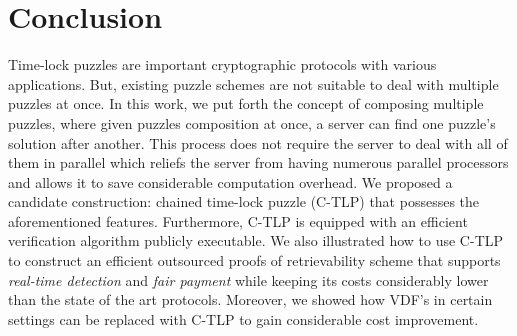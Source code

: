 \vspace{-4mm}

\section{Conclusion}
\vspace{-3mm}

Time-lock puzzles are important cryptographic protocols with various applications. But,  existing puzzle schemes are not suitable to deal with multiple puzzles at once.  In this work, we put forth the concept of composing multiple puzzles, where given puzzles composition at once, a server can find one puzzle's solution after another. This process does not require the server to deal with all of them in parallel which reliefs the server from having numerous parallel processors and allows it to save considerable computation overhead. We proposed a candidate construction: chained  time-lock puzzle (C-TLP) that possesses the aforementioned features. Furthermore, C-TLP is equipped with an efficient verification algorithm publicly executable.  We also illustrated how to use C-TLP to construct an  efficient outsourced  proofs of retrievability scheme that supports \emph{real-time detection} and \emph{fair payment} while keeping its costs considerably lower than the state of the art protocols. Moreover, we showed how VDF's in certain settings can be replaced with C-TLP to gain considerable cost improvement.






